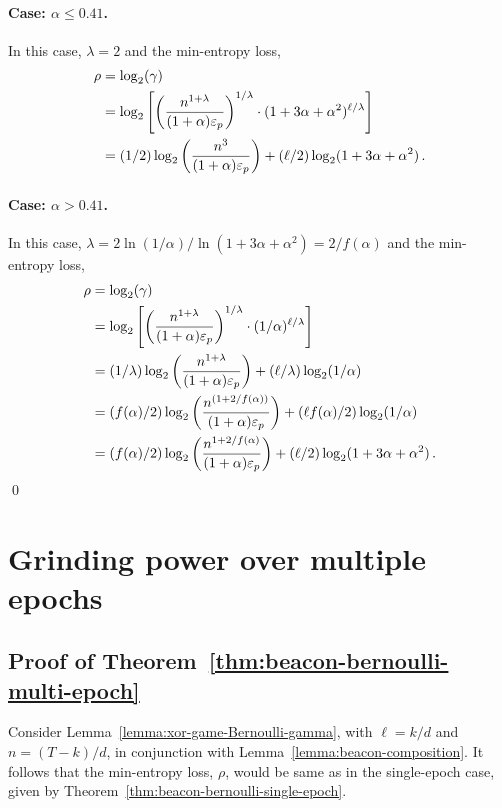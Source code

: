   \paragraph{Case: $\alpha \leq 0.41$.}
  In this case, $\lambda = 2$ and 
  the min-entropy loss, 
  \begin{align*}
    \rho &= \log_2(\gamma) \\
        &= \log_2 \left[  \left(\frac{n^{1 + \lambda} }{ (1+\alpha) \mathsf{\varepsilon}_p} \right)^{1/\lambda}
          \cdot (1 + 3 \alpha + \alpha^2)^{\ell/\lambda}
        \right] \\
        &= (1/2)\log_2 \left(\frac{n^3}{ (1+\alpha) \mathsf{\varepsilon}_p} \right) 
          + (\ell/2) \log_2(1 + 3 \alpha + \alpha^2)
        \,.
  \end{align*}
  
  \paragraph{Case: $\alpha > 0.41$.}
  In this case, $\lambda = 2 \ln(1/\alpha)/\ln(1+3\alpha+\alpha^2) = 2/f(\alpha)$ and 
  the min-entropy loss, 
  \begin{align*}
    \rho &= \log_2(\gamma) \\
        &= \log_2 \left[  \left(\frac{n^{1 + \lambda} }{ (1+\alpha) \mathsf{\varepsilon}_p} \right)^{1/\lambda}
          \cdot (1/\alpha)^{\ell/\lambda}
        \right] \\
        &= (1/\lambda) \log_2 \left(\frac{n^{1 + \lambda} }{ (1+\alpha) \mathsf{\varepsilon}_p} \right)
          + (\ell/\lambda) \log_2(1/\alpha)
        \\
        &= (f(\alpha)/2)\log_2 \left(\frac{n^{(1 + 2/f(\alpha))} }{ (1+\alpha) \mathsf{\varepsilon}_p} \right) 
          + (\ell f(\alpha)/2) \log_2(1/\alpha)
          \\
        &= (f(\alpha)/2)\log_2 \left(\frac{n^{1 + 2/f(\alpha)} }{ (1+\alpha) \mathsf{\varepsilon}_p} \right) 
          + (\ell/2) \log_2(1 + 3\alpha + \alpha^2)
        \,.
  \end{align*}
\hfill\qed





\section{Grinding power over multiple epochs}

\subsection*{Proof of Theorem~\ref{thm:beacon-bernoulli-multi-epoch}}
  Consider Lemma~\ref{lemma:xor-game-Bernoulli-gamma}, 
  with $\ell = k/d$ and $n = (T-k)/d$, 
  in conjunction with Lemma~\ref{lemma:beacon-composition}.
  It follows that the min-entropy loss, $\rho$, 
  would be same as in the single-epoch case, 
  given by Theorem~\ref{thm:beacon-bernoulli-single-epoch}.

